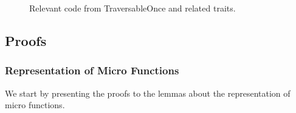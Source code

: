\begin{figure}
\caption{Relevant code from \textsf{TraversableOnce} and related traits.}
\label{fig:traversableonce}
\end{figure}

\subsection{Proofs}

\subsubsection{Representation of Micro Functions}
We start by presenting the proofs to the lemmas about the representation of micro functions.

\equalEq*
